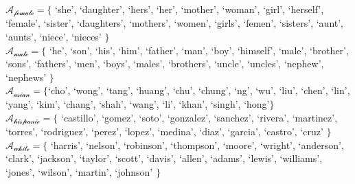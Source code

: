 $\mathcal{A_\text{female}} = \{$ `she', `daughter', `hers', `her', `mother', `woman', `girl', `herself', `female', `sister', `daughters', `mothers', `women', `girls', `femen', `sisters', `aunt', `aunts', `niece', `nieces' $\}$ \\

$\mathcal{A_\text{male}} = \{$ `he', `son', `his', `him', `father', `man', `boy', `himself', `male', `brother', `sons', `fathers', `men', `boys', `males', `brothers', `uncle', `uncles', `nephew', `nephews' $\}$ \\

$\mathcal{A_\text{asian}} = \{$`cho', `wong', `tang', `huang', `chu', `chung', `ng', `wu', `liu', `chen', `lin', `yang', `kim', `chang', `shah', `wang', `li', `khan', `singh', `hong'$\}$ \\

$\mathcal{A_\text{hispanic}} = \{$ `castillo', `gomez', `soto', `gonzalez', `sanchez', `rivera', `martinez', `torres', `rodriguez', `perez', `lopez', `medina', `diaz', `garcia', `castro', `cruz' $\}$ \\

$\mathcal{A_\text{white}} = \{$ `harris', `nelson', `robinson', `thompson', `moore', `wright', `anderson', `clark', `jackson', `taylor', `scott', `davis', `allen', `adams', `lewis', `williams', `jones', `wilson', `martin', `johnson' $\}$ \\

